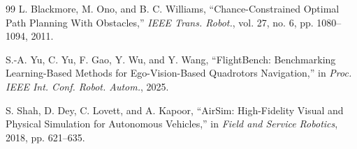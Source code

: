 \documentclass[letterpaper,10pt,conference]{ieeeconf}
\begin{document}
{\begin{thebibliography}{99}
L. Blackmore, M. Ono, and B. C. Williams,
``Chance-Constrained Optimal Path Planning With Obstacles,'' \emph{IEEE
Trans. Robot.}, vol. 27, no. 6, pp. 1080--1094, 2011.

S.-A. Yu, C. Yu, F. Gao, Y. Wu, and Y. Wang,
``FlightBench: Benchmarking Learning-Based Methods for Ego-Vision-Based
Quadrotors Navigation,'' in \emph{Proc. IEEE Int. Conf. Robot. Autom.},
2025.

S. Shah, D. Dey, C. Lovett, and A. Kapoor,
``AirSim: High-Fidelity Visual and Physical Simulation for Autonomous
Vehicles,'' in \emph{Field and Service Robotics}, 2018, pp. 621--635.

\end{thebibliography}
}
\end{document}
